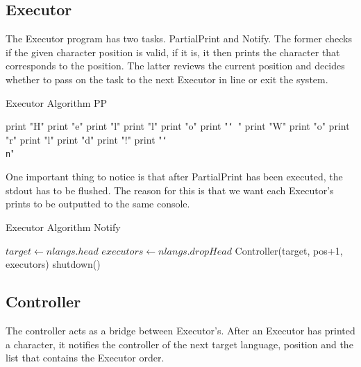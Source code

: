 \documentclass[11pt]{article}
\begin{document}
\subsection{Executor}
The Executor program has two tasks. PartialPrint and Notify. The former checks if the given character position is valid, if it is, it then prints the character that corresponds to the position. The latter reviews the current position and decides whether to pass on the task to the next Executor in line or exit the system.

\begin{algorithm}
\caption{Executor Algorithm PP}
\label{Special Edition}
\begin{algorithmic}[2]
	\State print "H"
	\State print "e"
	\State print "l" 
	\State print "l"
	\State print "o"
	\State print "\texttt{\char`\ }"
	\State print "W"
	\State print "o"
	\State print "r"
	\State print "l" 
	\State print "d"
	\State print "!"
	\State print "\texttt{\char`\\n}"
\EndIf
\EndProcedure
\end{algorithmic}
\end{algorithm}
One important thing to notice is that after PartialPrint has been executed, the stdout has to be flushed. The reason for this is that we want each Executor's prints to be outputted to the same console.

\begin{algorithm}
\caption{Executor Algorithm Notify}
\label{Special Edition}
\begin{algorithmic}[2]
 \State $target\gets nlangs.head$
	\State $executors\gets nlangs.dropHead$	
	\State Controller(target,  pos+1, executors)
\Else
	\State shutdown() 
\EndIf
\EndProcedure
\end{algorithmic}
\end{algorithm}




\subsection{Controller}
The controller acts as a bridge between Executor's. After an Executor has printed a character, it notifies the controller of the next target language, position and the list that contains the Executor order.
\end{document}
